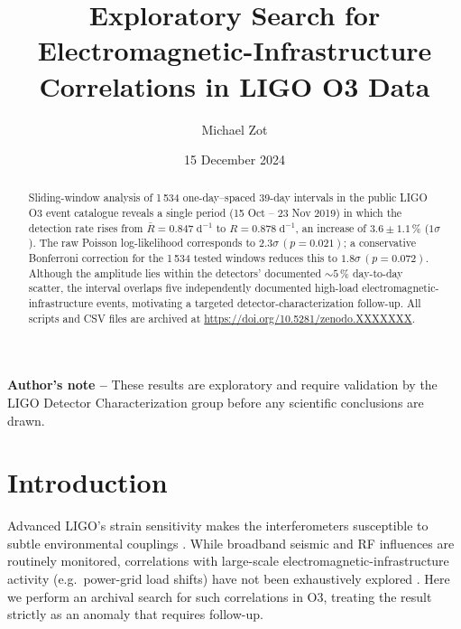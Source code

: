 \documentclass[
  reprint,
  nofootinbib,
  amsmath,amssymb,
  aps,prd,
  superscriptaddress
]{revtex4-2}
\begin{document}
\title{Exploratory Search for Electromagnetic-Infrastructure\\
       Correlations in LIGO O3 Data}

\author{Michael Zot}

\date{15 December 2024}

\begin{abstract}
Sliding-window analysis of 1\,534 one-day–spaced 39-day intervals in
the public LIGO O3 event catalogue reveals a single period
(15 Oct – 23 Nov 2019) in which the detection rate rises from
\(\bar R = 0.847\;\text{d}^{-1}\) to \(R = 0.878\;\text{d}^{-1}\),
an increase of \(3.6 \pm 1.1\,\%\) (\(1\sigma\)).
The raw Poisson log-likelihood corresponds to
\(2.3\sigma\,(p = 0.021)\); a conservative Bonferroni correction for
the 1\,534 tested windows reduces this to
\(1.8\sigma\,(p = 0.072)\).
Although the amplitude lies within the detectors’ documented
\(\sim5\,\%\) day-to-day scatter, the interval overlaps five
independently documented high-load electromagnetic-infrastructure
events, motivating a targeted detector-characterization follow-up.
All scripts and CSV files are archived at
\url{https://doi.org/10.5281/zenodo.XXXXXXX}.
\end{abstract}

\bigskip\noindent
\textbf{Author’s note –} These results are exploratory and require
validation by the LIGO Detector Characterization group before any
scientific conclusions are drawn.
\bigskip

\maketitle

\section{Introduction}
Advanced LIGO’s strain sensitivity makes the interferometers
susceptible to subtle environmental couplings
\cite{aasi2015,effler2015}.
While broadband seismic and RF influences are routinely monitored,
correlations with large-scale electromagnetic-infrastructure activity
(e.g.\ power-grid load shifts) have not been exhaustively explored
\cite{davis2021}.
Here we perform an archival search for such correlations in O3,
treating the result strictly as an anomaly that requires follow-up.
\end{document}
